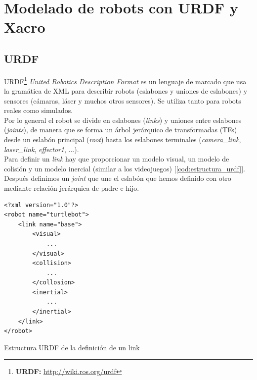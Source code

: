 \section{Modelado de robots con URDF y Xacro}
\label{sec:modelado_urdf_xacro}

\subsection{URDF}
\label{subsec:urdf}

URDF\footnote{\textbf{URDF:} \url{http://wiki.ros.org/urdf}}  \textit{United Robotics Description Format} es un lenguaje de marcado que usa la gramática de XML para describir robots (eslabones y uniones de eslabones) y sensores (cámaras, láser y muchos otros sensores). Se utiliza tanto para robots reales como simulados.\\

Por lo general el robot se divide en eslabones (\textit{links}) y uniones entre eslabones (\textit{joints}), de manera que se forma un árbol jerárquico de transformadas (TFs) desde un eslabón principal (\textit{root}) hasta los eslabones terminales (\textit{camera\_link}, \textit{laser\_link}, \textit{effector1}, ...).\\

Para definir un \textit{link} hay que proporcionar un modelo visual, un modelo de colisión y un modelo inercial (similar a los videojuegos) [\ref{cod:estructura_urdf}]. Después definimos un \textit{joint} que une el eslabón que hemos definido con otro mediante relación jerárquica de padre e hijo.\\

\begin{code}[H]
\begin{lstlisting}
<?xml version="1.0"?>
<robot name="turtlebot">
	<link name="base">
		<visual>
			...
		</visual>
		<collision>
			...
		</collosion>
		<inertial>
			...
		</inertial>
	</link>
</robot>
\end{lstlisting}
\caption[Estructura URDF de la definicion de un link]{Estructura URDF de la definición de un link}
\label{cod:estructura_urdf}
\end{code}

